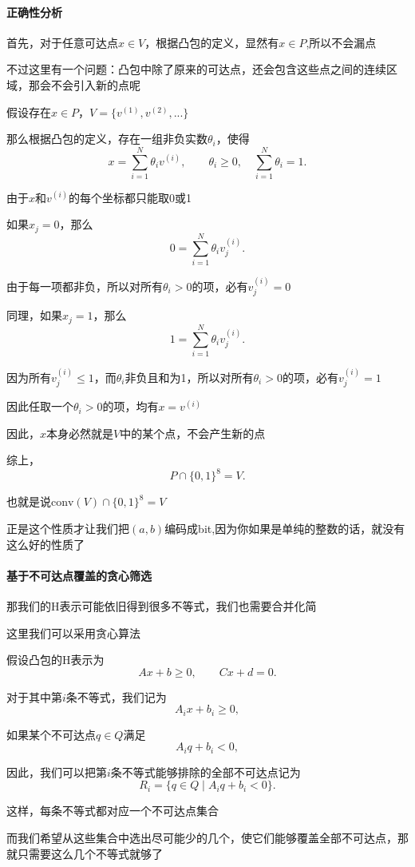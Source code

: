 \paragraph{正确性分析}

首先，对于任意可达点$x\in V$，根据凸包的定义，显然有$x\in P$,所以不会漏点

不过这里有一个问题：凸包中除了原来的可达点，还会包含这些点之间的连续区域，那会不会引入新的点呢

假设存在$x\in P$，$V=\{v^{(1)},v^{(2)},...\}$

那么根据凸包的定义，存在一组非负实数$\theta_i$，使得
\[
x=\sum_{i=1}^{N}\theta_i v^{(i)},
\qquad
\theta_i\ge0,\quad
\sum_{i=1}^{N}\theta_i=1.
\]

由于$x$和$v^{(i)}$的每个坐标都只能取0或1

如果$x_j=0$，那么
\[
0=\sum_{i=1}^{N}\theta_i v_j^{(i)}.
\]

由于每一项都非负，所以对所有$\theta_i>0$的项，必有$v_j^{(i)}=0$

同理，如果$x_j=1$，那么
\[
1=\sum_{i=1}^{N}\theta_i v_j^{(i)}.
\]

因为所有$v_j^{(i)}\le1$，而$\theta_i$非负且和为1，所以对所有$\theta_i>0$的项，必有$v_j^{(i)}=1$

因此任取一个$\theta_i>0$的项，均有$x=v^{(i)}$

因此，$x$本身必然就是$V$中的某个点，不会产生新的点

综上，
\[
P\cap\{0,1\}^{8}=V.
\]

也就是说$\text{conv}(V)\cap\{0,1\}^{8}=V$

正是这个性质才让我们把$(a,b)$编码成bit,因为你如果是单纯的整数的话，就没有这么好的性质了
\paragraph{基于不可达点覆盖的贪心筛选}

那我们的H表示可能依旧得到很多不等式，我们也需要合并化简

这里我们可以采用贪心算法

假设凸包的H表示为
\[
Ax+b\ge0,\qquad Cx+d=0.
\]

对于其中第$i$条不等式，我们记为
\[
A_i x+b_i\ge0,
\]

如果某个不可达点$q\in Q$满足
\[
A_iq+b_i<0,
\]

因此，我们可以把第$i$条不等式能够排除的全部不可达点记为
\[
R_i=\{q\in Q\mid A_iq+b_i<0\}.
\]

这样，每条不等式都对应一个不可达点集合

而我们希望从这些集合中选出尽可能少的几个，使它们能够覆盖全部不可达点，那就只需要这么几个不等式就够了

